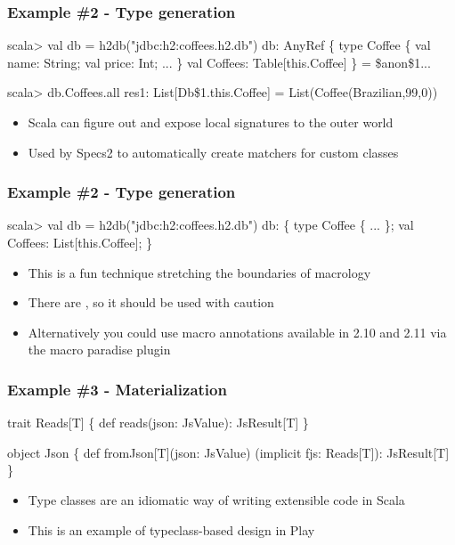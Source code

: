 \documentclass[svgnames,hyperref={bookmarks=false}]{beamer}
\begin{document}
\begin{frame}[fragile, t]
\frametitle{Example \#2 - Type generation}

\begin{semiverbatim}
scala> val db = \alert{h2db(}"jdbc:h2:coffees.h2.db"\alert{)}
db: AnyRef \{
  type Coffee \{ val name: String; val price: Int; ... \}
  val Coffees: Table[this.Coffee]
\} = \$anon\$1...

scala> db.Coffees.all
res1: List[Db\$1.this.Coffee] = List(Coffee(Brazilian,99,0))

\end{semiverbatim}

\begin{itemize}
\item Scala can figure out and expose local signatures to the outer world
\item Used by Specs2 to automatically create matchers for custom classes
\end{itemize}
\end{frame}

\begin{frame}[fragile]
\frametitle{Example \#2 - Type generation}

\begin{semiverbatim}
scala> val db = \alert{h2db(}"jdbc:h2:coffees.h2.db"\alert{)}
db: \{ type Coffee \{ ... \}; val Coffees: List[this.Coffee]; \}

\end{semiverbatim}

\begin{itemize}
\item This is a fun technique stretching the boundaries of macrology
\item There are , so it should be used with caution
\item Alternatively you could use macro annotations available in 2.10 and 2.11 via the macro paradise plugin
\end{itemize}
\end{frame}

\begin{frame}[fragile]
\frametitle{Example \#3 - Materialization}

\begin{semiverbatim}
trait Reads[T] \{
  def reads(json: JsValue): JsResult[T]
\}

object Json \{
  def fromJson[T](json: JsValue)
    (implicit fjs: Reads[T]): JsResult[T]
\}

\end{semiverbatim}

\begin{itemize}
\item Type classes are an idiomatic way of writing extensible code in Scala
\item This is an example of typeclass-based design in Play
\end{itemize}
\end{frame}
\end{document}
